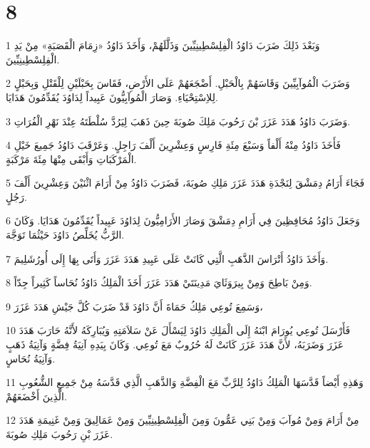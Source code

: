 \chapter{8}

\par 1 وَبَعْدَ ذَلِكَ ضَرَبَ دَاوُدُ الْفِلِسْطِينِيِّينَ وَذَلَّلَهُمْ، وَأَخَذَ دَاوُدُ «زِمَامَ الْقَصَبَةِ» مِنْ يَدِ الْفِلِسْطِينِيِّينَ.
\par 2 وَضَرَبَ الْمُوآبِيِّينَ وَقَاسَهُمْ بِالْحَبْلِ. أَضْجَعَهُمْ عَلَى الأَرْضِ، فَقَاسَ بِحَبْلَيْنِ لِلْقَتْلِ وَبِحَبْلٍ لِلاِسْتِحْيَاءِ. وَصَارَ الْمُوآبِيُّونَ عَبِيداً لِدَاوُدَ يُقَدِّمُونَ هَدَايَا.
\par 3 وَضَرَبَ دَاوُدُ هَدَدَ عَزَرَ بْنَ رَحُوبَ مَلِكَ صُوبَةَ حِينَ ذَهَبَ لِيَرُدَّ سُلْطَتَهُ عِنْدَ نَهْرِ الْفُرَاتِ.
\par 4 فَأَخَذَ دَاوُدُ مِنْهُ أَلْفاً وَسَبْعَ مِئَةِ فَارِسٍ وَعِشْرِينَ أَلْفَ رَاجِلٍ. وَعَرْقَبَ دَاوُدُ جَمِيعَ خَيْلِ الْمَرْكَبَاتِ وَأَبْقَى مِنْهَا مِئَةَ مَرْكَبَةٍ.
\par 5 فَجَاءَ أَرَامُ دِمَشْقَ لِنَجْدَةِ هَدَدَ عَزَرَ مَلِكِ صُوبَةَ، فَضَرَبَ دَاوُدُ مِنْ أَرَامَ اثْنَيْنَ وَعِشْرِينَ أَلْفَ رَجُلٍ.
\par 6 وَجَعَلَ دَاوُدُ مُحَافِظِينَ فِي أَرَامِ دِمَشْقَ وَصَارَ الأَرَامِيُّونَ لِدَاوُدَ عَبِيداً يُقَدِّمُونَ هَدَايَا. وَكَانَ الرَّبُّ يُخَلِّصُ دَاوُدَ حَيْثُمَا تَوَجَّهَ.
\par 7 وَأَخَذَ دَاوُدُ أَتْرَاسَ الذَّهَبِ الَّتِي كَانَتْ عَلَى عَبِيدِ هَدَدَ عَزَرَ وَأَتَى بِهَا إِلَى أُورُشَلِيمَ.
\par 8 وَمِنْ بَاطِحَ وَمِنْ بِيرَوَثَايَ مَدِينَتَيْ هَدَدَ عَزَرَ أَخَذَ الْمَلِكُ دَاوُدُ نُحَاساً كَثِيراً جِدّاً.
\par 9 وَسَمِعَ تُوعِي مَلِكُ حَمَاةَ أَنَّ دَاوُدَ قَدْ ضَرَبَ كُلَّ جَيْشِ هَدَدَ عَزَرَ،
\par 10 فَأَرْسَلَ تُوعِي يُورَامَ ابْنَهُ إِلَى الْمَلِكِ دَاوُدَ لِيَسْأَلَ عَنْ سَلاَمَتِهِ وَيُبَارِكَهُ لأَنَّهُ حَارَبَ هَدَدَ عَزَرَ وَضَرَبَهُ، لأَنَّ هَدَدَ عَزَرَ كَانَتْ لَهُ حُرُوبٌ مَعَ تُوعِي. وَكَانَ بِيَدِهِ آنِيَةُ فِضَّةٍ وَآنِيَةُ ذَهَبٍ وَآنِيَةُ نُحَاسٍ.
\par 11 وَهَذِهِ أَيْضاً قَدَّسَهَا الْمَلِكُ دَاوُدُ لِلرَّبِّ مَعَ الْفِضَّةِ وَالذَّهَبِ الَّذِي قَدَّسَهُ مِنْ جَمِيعِ الشُّعُوبِ الَّذِينَ أَخْضَعَهُمْ.
\par 12 مِنْ أَرَامَ وَمِنْ مُوآبَ وَمِنْ بَنِي عَمُّونَ وَمِنَ الْفِلِسْطِينِيِّينَ وَمِنْ عَمَالِيقَ وَمِنْ غَنِيمَةِ هَدَدَ عَزَرَ بْنِ رَحُوبَ مَلِكِ صُوبَةَ.
